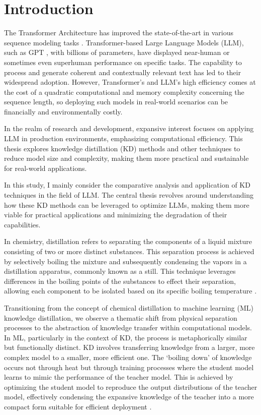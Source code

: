 \chapter{Introduction}
\label{chap:intro}

The Transformer Architecture has improved the state-of-the-art in various sequence modeling tasks \cite{attention}. Transformer-based Large Language Models (LLM), such as GPT \cite{gpt}, with billions of parameters, have displayed near-human or sometimes even superhuman performance on specific tasks. The capability to process and generate coherent and contextually relevant text has led to their widespread adoption. However, Transformer's and LLM's high efficiency comes at the cost of a quadratic computational and memory complexity concerning the sequence length, so deploying such models in real-world scenarios can be financially and environmentally costly.

In the realm of research and development, expansive interest focuses on applying LLM in production environments, emphasizing computational efficiency. This thesis explores knowledge distillation (KD) methods and other techniques to reduce model size and complexity, making them more practical and sustainable for real-world applications.

In this study, I mainly consider the comparative analysis and application of KD techniques in the field of LLM\@. The central thesis revolves around understanding how these KD methods can be leveraged to optimize LLMs, making them more viable for practical applications and minimizing the degradation of their capabilities.

In chemistry, distillation refers to separating the components of a liquid mixture consisting of two or more distinct substances. This separation process is achieved by selectively boiling the mixture and subsequently condensing the vapors in a distillation apparatus, commonly known as a still. This technique leverages differences in the boiling points of the substances to effect their separation, allowing each component to be isolated based on its specific boiling temperature \cite{chem_distil}.

Transitioning from the concept of chemical distillation to machine learning (ML) knowledge distillation, we observe a thematic shift from physical separation processes to the abstraction of knowledge transfer within computational models. In ML, particularly in the context of KD, the process is metaphorically similar but functionally distinct. KD involves transferring knowledge from a larger, more complex model to a smaller, more efficient one. The `boiling down' of knowledge occurs not through heat but through training processes where the student model learns to mimic the performance of the teacher model. This is achieved by optimizing the student model to reproduce the output distributions of the teacher model, effectively condensing the expansive knowledge of the teacher into a more compact form suitable for efficient deployment \cite{distilling}.

